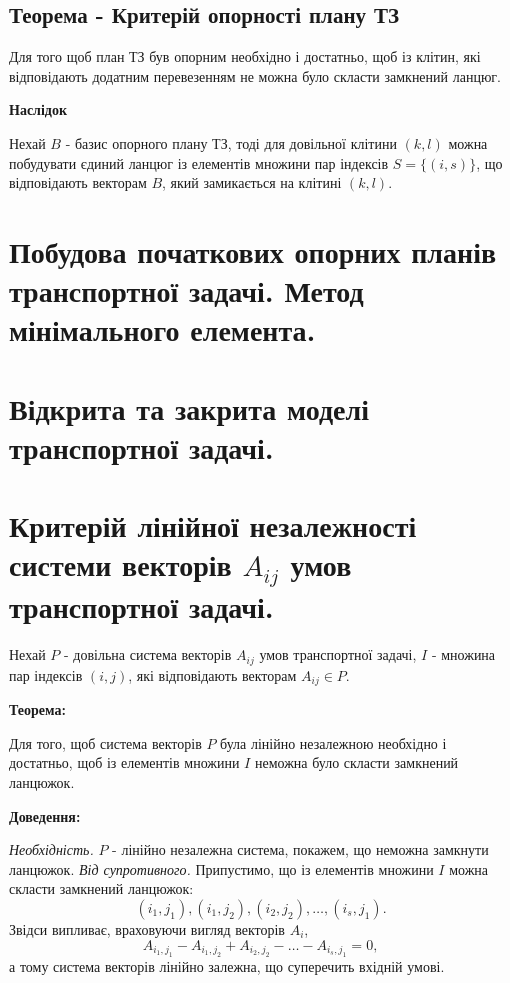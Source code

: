 \documentclass[12pt,a4paper]{article}
\begin{document}
\subsection{Теорема - Критерій опорності плану ТЗ}

Для того щоб план ТЗ був опорним необхідно і достатньо, щоб із клітин, які відповідають додатним перевезенням не можна було скласти замкнений ланцюг.

{\bf Наслідок}

Нехай $B$ - базис опорного плану ТЗ, тоді для довільної клітини $(k,l)$ можна побудувати єдиний ланцюг із елементів множини пар індексів $S=\{(i,s)\}$, що відповідають векторам $B$, який замикається на клітині $(k,l)$.

\clearpage

\section{Побудова початкових опорних планів транспортної задачі. Метод мінімального елемента.}

\clearpage

\section{Відкрита та закрита моделі транспортної задачі.}

\clearpage

\section{Критерій лінійної незалежності системи векторів $A_{ij}$ умов транспортної задачі.}

Нехай $P$ - довільна система векторів $A_{ij}$ умов транспортної задачі, $I$ - множина пар індексів $(i,j)$, які відповідають векторам $A_{ij} \in P$.

{\bf Теорема:}

Для того, щоб система векторів $P$ була лінійно незалежною необхідно і достатньо, щоб із елементів множини $I$ неможна було скласти замкнений ланцюжок.

{\bf Доведення:}

{\it Необхідність.} $P$ - лінійно незалежна система, покажем, що неможна замкнути ланцюжок. {\it Від супротивного.} Припустимо, що із елементів множини $I$ можна скласти замкнений ланцюжок: $$(i_1,j_1), (i_1,j_2), (i_2,j_2), \dots, (i_s,j_1).$$ Звідси випливає, враховуючи вигляд векторів $A_i$, $$A_{{i_1},{j_1}}-A_{{i_1},{j_2}}+A_{{i_2},{j_2}}-\dots-A_{{i_s},{j_1}}=0,$$ а тому система векторів лінійно залежна, що суперечить вхідній умові.
\end{document}
